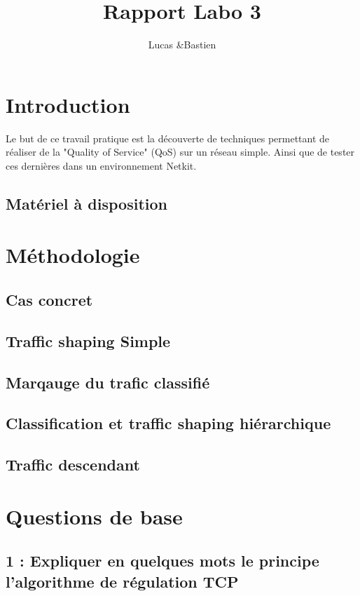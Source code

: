 \documentclass{article}
\title{Rapport Labo 3}
\author{Lucas \bsc{Bulloni} \&Bastien \bsc{Wermeille}}
\begin{document}
\maketitle

 

\section{Introduction}
 Le but de ce travail pratique est la découverte de techniques permettant de réaliser de la "Quality of Service" (QoS) sur un réseau simple. Ainsi que de tester ces dernières dans un environnement Netkit.

\subsection{Matériel à disposition}


\section{Méthodologie}

\subsection{Cas concret}

\subsection{Traffic shaping Simple}

\subsection{Marqauge du trafic classifié}

\subsection{Classification et traffic shaping hiérarchique}

\subsection{Traffic descendant}

\section{Questions de base}

\subsection{1 : Expliquer en quelques mots le principe l'algorithme de régulation TCP}
\end{document}
